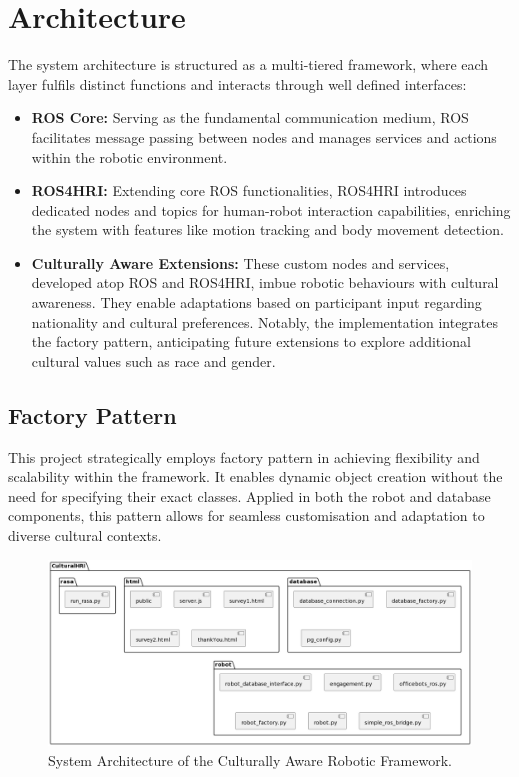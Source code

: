 \section{Architecture}

The system architecture is structured as a multi-tiered framework, where each layer fulfils distinct functions and interacts through well defined interfaces:

\begin{itemize}
    \item \textbf{ROS Core:} Serving as the fundamental communication medium, ROS facilitates message passing between nodes and manages services and actions within the robotic environment.
    \item \textbf{ROS4HRI:} Extending core ROS functionalities, ROS4HRI introduces dedicated nodes and topics for human-robot interaction capabilities, enriching the system with features like motion tracking and body movement detection.
    \item \textbf{Culturally Aware Extensions:} These custom nodes and services, developed atop ROS and ROS4HRI, imbue robotic behaviours with cultural awareness. They enable adaptations based on participant input regarding nationality and cultural preferences. Notably, the implementation integrates the factory pattern, anticipating future extensions to explore additional cultural values such as race and gender.
\end{itemize}

\subsection{Factory Pattern}

This project strategically employs factory pattern in achieving flexibility and scalability within the framework. It enables dynamic object creation without the need for specifying their exact classes. Applied in both the robot and database components, this pattern allows for seamless customisation and adaptation to diverse cultural contexts.

\begin{figure}
    \begin{center}
        \noindent\includegraphics[width=\linewidth]{Chapter5/package.png}  
        \caption{System Architecture of the Culturally Aware Robotic Framework.}
        \label{fig:figure1}
    \end{center}
\end{figure}

